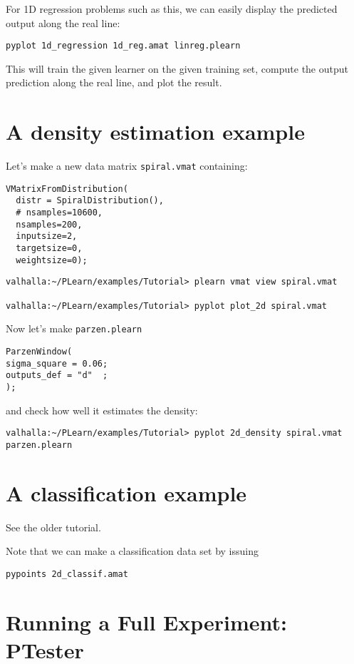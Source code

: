 \documentclass[11pt]{book}
\begin{document}
For 1D regression problems such as this, we can easily display the
predicted output along the real line:
\begin{verbatim}
pyplot 1d_regression 1d_reg.amat linreg.plearn
\end{verbatim}

This will train the given learner on the given training set, compute the
output prediction along the real line, and plot the result.

\section{A density estimation example}

Let's make a new data matrix \verb!spiral.vmat! containing:

\begin{verbatim}
VMatrixFromDistribution(
  distr = SpiralDistribution(),
  # nsamples=10600,
  nsamples=200,
  inputsize=2,
  targetsize=0,
  weightsize=0);
\end{verbatim}

\begin{verbatim}
valhalla:~/PLearn/examples/Tutorial> plearn vmat view spiral.vmat

valhalla:~/PLearn/examples/Tutorial> pyplot plot_2d spiral.vmat
\end{verbatim}

Now let's make \verb!parzen.plearn!
\begin{verbatim}
ParzenWindow(
sigma_square = 0.06;
outputs_def = "d"  ;
);
\end{verbatim}

and check how well it estimates the density:

\begin{verbatim}
valhalla:~/PLearn/examples/Tutorial> pyplot 2d_density spiral.vmat parzen.plearn
\end{verbatim}


\section{A classification example}

See the older tutorial.

Note that we can make a classification data set by issuing
\begin{verbatim}
pypoints 2d_classif.amat
\end{verbatim}

\section{Running a Full Experiment: PTester}
\end{document}
